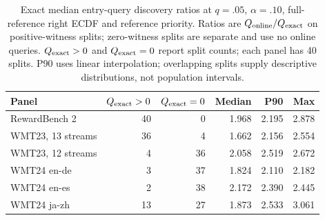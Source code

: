 \begin{table}[t]
\centering\small


\begin{tabular}{lrrrrr}
\toprule
Panel & $Q_{\rm exact}>0$ & $Q_{\rm exact}=0$ & Median & P90 & Max \\
\midrule
RewardBench 2 & 40 & 0 & 1.968 & 2.195 & 2.878 \\
WMT23, 13 streams & 36 & 4 & 1.662 & 2.156 & 2.554 \\
WMT23, 12 streams & 4 & 36 & 2.058 & 2.519 & 2.672 \\
WMT24 en-de & 3 & 37 & 1.824 & 2.110 & 2.182 \\
WMT24 en-es & 2 & 38 & 2.172 & 2.390 & 2.445 \\
WMT24 ja-zh & 13 & 27 & 1.873 & 2.533 & 3.061 \\
\bottomrule
\end{tabular}
\caption{Exact median entry-query discovery ratios at $q=.05$, $\alpha=.10$, full-reference right ECDF and reference priority. Ratios are $Q_{\rm online}/Q_{\rm exact}$ on positive-witness splits; zero-witness splits are separate and use no online queries. $Q_{\rm exact}>0$ and $Q_{\rm exact}=0$ report split counts; each panel has 40 splits. P90 uses linear interpolation; overlapping splits supply descriptive distributions, not population intervals.}
\label{tab:entry-overhead-summary}
\end{table}
